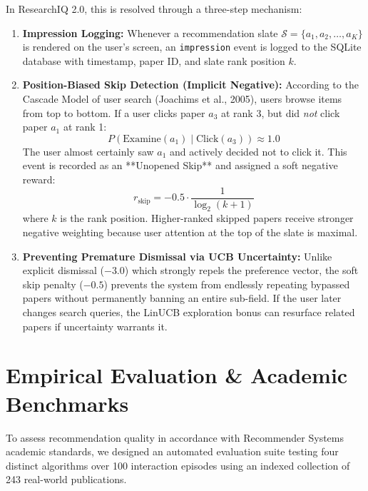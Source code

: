 \documentclass[11pt,a4paper]{article}
\begin{document}
In ResearchIQ 2.0, this is resolved through a three-step mechanism:
\begin{enumerate}[leftmargin=1.5em]
    \item \textbf{Impression Logging:} Whenever a recommendation slate $\mathcal{S} = \{a_1, a_2, \dots, a_K\}$ is rendered on the user's screen, an \texttt{impression} event is logged to the SQLite database with timestamp, paper ID, and slate rank position $k$.
    \item \textbf{Position-Biased Skip Detection (Implicit Negative):} According to the Cascade Model of user search (Joachims et al., 2005), users browse items from top to bottom. If a user clicks paper $a_3$ at rank 3, but did \textit{not} click paper $a_1$ at rank 1:
    \begin{equation}
    P(\text{Examine}(a_1) \mid \text{Click}(a_3)) \approx 1.0
    \end{equation}
    The user almost certainly saw $a_1$ and actively decided not to click it. This event is recorded as an **Unopened Skip** and assigned a soft negative reward:
    \begin{equation}
    r_{\text{skip}} = -0.5 \cdot \frac{1}{\log_2(k + 1)}
    \end{equation}
    where $k$ is the rank position. Higher-ranked skipped papers receive stronger negative weighting because user attention at the top of the slate is maximal.
    \item \textbf{Preventing Premature Dismissal via UCB Uncertainty:} Unlike explicit dismissal ($-3.0$) which strongly repels the preference vector, the soft skip penalty ($-0.5$) prevents the system from endlessly repeating bypassed papers without permanently banning an entire sub-field. If the user later changes search queries, the LinUCB exploration bonus can resurface related papers if uncertainty warrants it.
\end{enumerate}

\section{Empirical Evaluation \& Academic Benchmarks}

To assess recommendation quality in accordance with Recommender Systems academic standards, we designed an automated evaluation suite testing four distinct algorithms over 100 interaction episodes using an indexed collection of 243 real-world publications.
\end{document}

